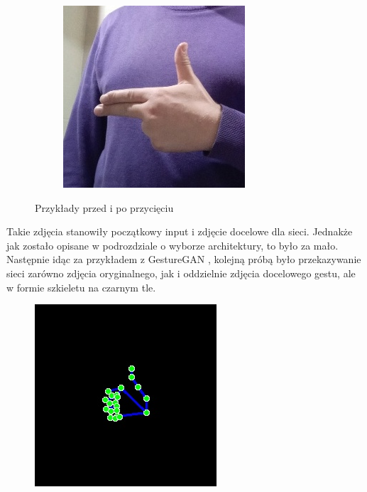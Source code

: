 \documentclass[12pt]{article}
\begin{document}
\begin{sloppypar}
{{\begin{figure}
\begin{subfigure}{.5\textwidth}
        \label{fig:original}
      \end{subfigure}%
      \begin{subfigure}{.5\textwidth}
        \centering
        \includegraphics[width=.8\linewidth]{cropped.jpg}
        \label{fig:cropped}
      \end{subfigure}
      \caption{Przykłady przed i po przycięciu}
      \label{fig:orig-crop}
    \end{figure}
    Takie zdjęcia stanowiły początkowy input i zdjęcie docelowe dla sieci. 
    Jednakże jak zostało opisane w podrozdziale o wyborze architektury, to było za mało. \\
    Następnie idąc za przykładem z GestureGAN \cite{gesture-gan}, kolejną próbą było przekazywanie sieci zarówno zdjęcia oryginalnego, jak i oddzielnie zdjęcia docelowego gestu, ale w formie szkieletu na czarnym tle.
    \begin{figure}[H]
      \centering
      \includegraphics{landmark.jpg}

\end{figure}}}
\end{sloppypar}
\end{document}
